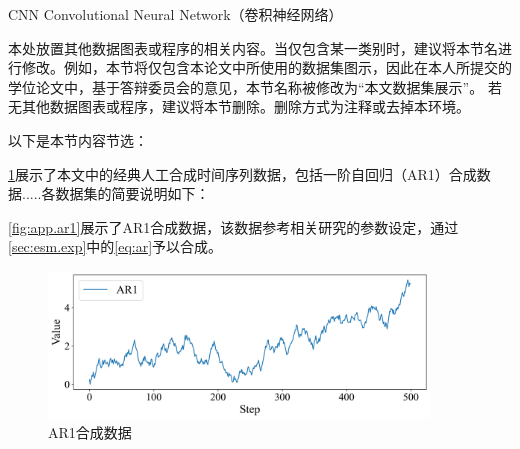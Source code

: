 \begin{denotation}
\item[CNN] Convolutional Neural Network（卷积神经网络）
\end{denotation}


\begin{otherDatas}
    本处放置其他数据图表或程序的相关内容。当仅包含某一类别时，建议将本节名进行修改。例如，本节将仅包含本论文中所使用的数据集图示，因此在本人所提交的学位论文中，基于答辩委员会的意见，本节名称被修改为“本文数据集展示”。 若无其他数据图表或程序，建议将本节删除。删除方式为注释或去掉本环境。
    
    以下是本节内容节选：

    \cref{fig:app.ar1}展示了本文中的经典人工合成时间序列数据，包括一阶自回归（AR1）合成数据.....各数据集的简要说明如下：

    \autoref{fig:app.ar1}展示了AR1合成数据，该数据参考相关研究\cite{qi2008trend,crone2016feature}的参数设定，通过\autoref{sec:esm.exp}中的\autoref{eq:ar}予以合成。

    \begin{figure}[h]
        \centering
        \includegraphics[width = 0.9\textwidth]{float/ch.app/ar1.png}
        \captionsetup{skip=2pt}
        \setlength{\belowcaptionskip}{-8pt}
        \caption{AR1合成数据\label{fig:app.ar1}}
    \end{figure}
    
\end{otherDatas}
% 